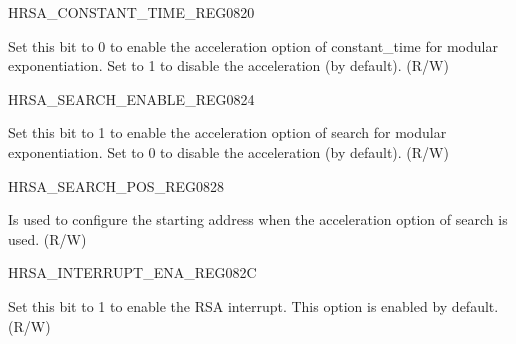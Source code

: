 \begin{register}{H}{RSA\_CONSTANT\_TIME\_REG}{\hexprefix{}0820}\label{regdesc:RSACONSTANTTIMEREG}
%
%
\regnewline%
\begin{regdesc}\begin{reglist}
\item [RSA\_CONSTANT\_TIME\_REG] Set this bit to 0 to enable the acceleration option of constant\_time for modular exponentiation. Set to 1 to disable the acceleration (by default). (R/W)
\end{reglist}\end{regdesc}
\end{register}


\begin{register}{H}{RSA\_SEARCH\_ENABLE\_REG}{\hexprefix{}0824}\label{regdesc:RSASEARCHENABLEREG}
%
%
\regnewline%
\begin{regdesc}\begin{reglist}
\item [RSA\_SEARCH\_ENABLE] Set this bit to 1 to enable the acceleration option of search for modular exponentiation. Set to 0 to disable the acceleration (by default). (R/W)
\end{reglist}\end{regdesc}
\end{register}



\begin{register}{H}{RSA\_SEARCH\_POS\_REG}{\hexprefix{}0828}\label{regdesc:RSASEARCHPOSREG}
%
%
\regnewline%
\begin{regdesc}\begin{reglist}
\item [RSA\_SEARCH\_POS] Is used to configure the starting address when the acceleration option of search is used. (R/W)
\end{reglist}\end{regdesc}
\end{register}


\begin{register}{H}{RSA\_INTERRUPT\_ENA\_REG}{\hexprefix{}082C}\label{regdesc:RSAINTERRUPTENAREG}
%
%
\regnewline%
\begin{regdesc}\begin{reglist}
\item [RSA\_INTERRUPT\_ENA] Set this bit to 1 to enable the RSA interrupt. This option is enabled by default. (R/W)
\end{reglist}\end{regdesc}
\end{register}


